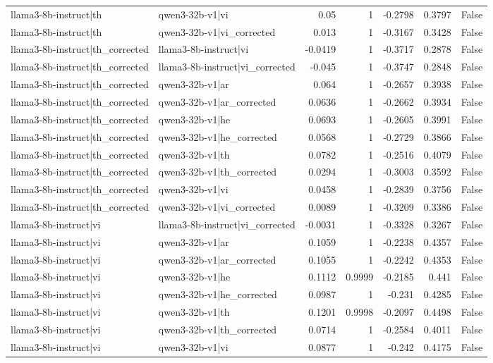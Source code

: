 \begin{table}
\begin{tabular}{l l r r r r l}
llama3-8b-instruct|th & qwen3-32b-v1|vi & 0.05 & 1 & -0.2798 & 0.3797 & False \\
llama3-8b-instruct|th & qwen3-32b-v1|vi_corrected & 0.013 & 1 & -0.3167 & 0.3428 & False \\
llama3-8b-instruct|th_corrected & llama3-8b-instruct|vi & -0.0419 & 1 & -0.3717 & 0.2878 & False \\
llama3-8b-instruct|th_corrected & llama3-8b-instruct|vi_corrected & -0.045 & 1 & -0.3747 & 0.2848 & False \\
llama3-8b-instruct|th_corrected & qwen3-32b-v1|ar & 0.064 & 1 & -0.2657 & 0.3938 & False \\
llama3-8b-instruct|th_corrected & qwen3-32b-v1|ar_corrected & 0.0636 & 1 & -0.2662 & 0.3934 & False \\
llama3-8b-instruct|th_corrected & qwen3-32b-v1|he & 0.0693 & 1 & -0.2605 & 0.3991 & False \\
llama3-8b-instruct|th_corrected & qwen3-32b-v1|he_corrected & 0.0568 & 1 & -0.2729 & 0.3866 & False \\
llama3-8b-instruct|th_corrected & qwen3-32b-v1|th & 0.0782 & 1 & -0.2516 & 0.4079 & False \\
llama3-8b-instruct|th_corrected & qwen3-32b-v1|th_corrected & 0.0294 & 1 & -0.3003 & 0.3592 & False \\
llama3-8b-instruct|th_corrected & qwen3-32b-v1|vi & 0.0458 & 1 & -0.2839 & 0.3756 & False \\
llama3-8b-instruct|th_corrected & qwen3-32b-v1|vi_corrected & 0.0089 & 1 & -0.3209 & 0.3386 & False \\
llama3-8b-instruct|vi & llama3-8b-instruct|vi_corrected & -0.0031 & 1 & -0.3328 & 0.3267 & False \\
llama3-8b-instruct|vi & qwen3-32b-v1|ar & 0.1059 & 1 & -0.2238 & 0.4357 & False \\
llama3-8b-instruct|vi & qwen3-32b-v1|ar_corrected & 0.1055 & 1 & -0.2242 & 0.4353 & False \\
llama3-8b-instruct|vi & qwen3-32b-v1|he & 0.1112 & 0.9999 & -0.2185 & 0.441 & False \\
llama3-8b-instruct|vi & qwen3-32b-v1|he_corrected & 0.0987 & 1 & -0.231 & 0.4285 & False \\
llama3-8b-instruct|vi & qwen3-32b-v1|th & 0.1201 & 0.9998 & -0.2097 & 0.4498 & False \\
llama3-8b-instruct|vi & qwen3-32b-v1|th_corrected & 0.0714 & 1 & -0.2584 & 0.4011 & False \\
llama3-8b-instruct|vi & qwen3-32b-v1|vi & 0.0877 & 1 & -0.242 & 0.4175 & False \\

\end{tabular}
\end{table}
